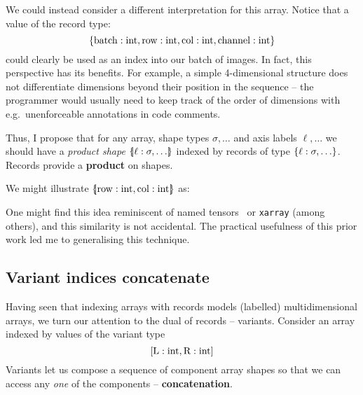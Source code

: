 We could instead consider a different interpretation for this array. Notice that a value of the record type:
$$ \srecordtype{ \mathrm{batch}: \sint, \mathrm{row}: \sint, \mathrm{col}: \sint, \mathrm{channel}: \sint } $$
could clearly be used as an index into our batch of images. In fact, this perspective has its benefits. For example, a simple 4-dimensional structure does not differentiate dimensions beyond their position in the sequence -- the programmer would usually need to keep track of the order of dimensions with e.g.\ unenforceable annotations in code comments. 

Thus, I propose that for any array, shape types $\sigma, \dots$ and axis labels $\ell, \dots$ we should have a \textit{product shape} $\sproducttype{\ell : \sigma, \dots}$ indexed by records of type $\srecordtype{\ell : \sigma, \dots}$.
Records provide a \textbf{product} on shapes. 

We might illustrate $\sproducttype{\mathrm{row}: \sint, \mathrm{col}: \sint}$ as:
\begin{center}
\end{center}

One might find this idea reminiscent of named tensors~\cite{named-tensors} or \texttt{xarray} \cite{hoyer2017xarray} (among others), and this similarity is not accidental. The practical usefulness of this prior work led me to generalising this technique.

\subsection{Variant indices concatenate}

Having seen that indexing arrays with records models (labelled) multidimensional arrays, we turn our attention to the dual of records -- variants. 
Consider an array
indexed by values of the variant type
$$\svarianttype{\mathrm{L} : \sint, \mathrm{R} : \sint}$$
Variants let us compose a sequence of component array shapes so that we can access any \textit{one} of the components -- \textbf{concatenation}. 

